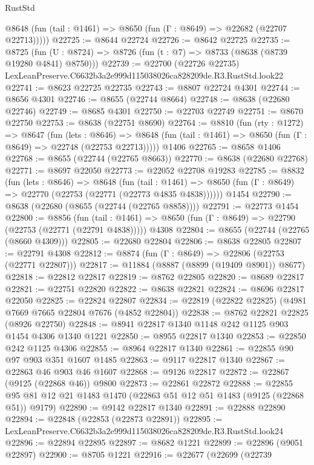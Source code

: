 \begin{lexlean}{RustStd}
\begin{coremodule}
      @8648 (fun (tail : @1461) => @8650 (fun (Γ : @8649) => @22682 (@22707 @22713)))))
@22725 := @8644 @22724
@22726 := @8642 @22725
@22735 := @8725
    (fun (U : @8724) => @8726 (fun (t : @7) => @8733 (@8638 (@8739 @19280 @4841) @8750)))
@22739 := @22700 (@22726 @22735) LexLeanPreserve.C6632b3a2e999d115038026ca828209de.R3.RustStd.look22
@22741 := @8623 @22725 @22735
@22743 := @8807 @22724 @4301
@22744 := @8656 @4301
@22746 := @8655 (@22744 @8664)
@22748 := @8638 (@22680 @22746)
@22749 := @8685 @4301
@22750 := @22703 @22749
@22751 := @8670 @22750
@22753 := @8638 (@22751 @8690)
@22764 := @8810
    (fun (rty : @1272) =>
    @8647
      (fun (lets : @8646) =>
      @8648 (fun (tail : @1461) => @8650 (fun (Γ : @8649) => @22748 (@22753 @22713)))))
    @1406
@22765 := @8658 @1406
@22768 := @8655 (@22744 (@22765 @8663))
@22770 := @8638 (@22680 @22768)
@22771 := @8697 @22050
@22773 := @22052 @22708 @19283
@22785 := @8832
    (fun (lets : @8646) =>
    @8648
      (fun (tail : @1461) =>
      @8650 (fun (Γ : @8649) => @22770 (@22753 (@22771 (@22773 @4835 @4838))))))
    @1454
@22790 := @8638 (@22680 (@8655 (@22744 (@22765 @8858))))
@22791 := @22773 @1454
@22800 := @8856
    (fun (tail : @1461) => @8650 (fun (Γ : @8649) => @22790 (@22753 (@22771 (@22791 @4838)))))
    @4308
@22804 := @8655 (@22744 (@22765 (@8660 @4309)))
@22805 := @22680 @22804
@22806 := @8638 @22805
@22807 := @22791 @4308
@22812 := @8874 (fun (Γ : @8649) => @22806 (@22753 (@22771 @22807)))
@22817 := @11884 (@8887 (@8899 (@19409 @8901)) @8677)
@22818 := @22812 @22817
@22819 := @8762 @22805
@22820 := @8689 @22817
@22821 := @22751 @22820
@22822 := @8638 @22821
@22824 := @8696 @22817 @22050
@22825 := @22824 @22807
@22834 := @22819 (@22822 @22825) (@4981 @7669 @7665 @22804 @7676 (@4852 @22804))
@22838 := @8762 @22821 @22825 (@8926 @22750)
@22848 := @8941 @22817 @1340 @1148 @242 @1125 @903 @1454 @4306 @1340 @1221
@22850 := @8955 @22817 @1340
@22853 := @22850 @242 @1125 @4306
@22855 := @8964 @22817 @1340
@22861 := @22855 @90 @97 @903 @351 @1607 @1485
@22863 := @9117 @22817 @1340
@22867 := @22863 @46 @903 @46 @1607
@22868 := @9126 @22817
@22872 := @22867 (@9125 (@22868 @46)) @9800
@22873 := @22861 @22872
@22888 := @22855 @95 @81 @12 @21 @1483 @1470 (@22863 @51 @12 @51 @1483 (@9125 (@22868 @51)) @9179)
@22890 := @9142 @22817 @1340
@22891 := @22888 @22890
@22894 := @22848 (@22853 (@22873 @22891))
@22895 := LexLeanPreserve.C6632b3a2e999d115038026ca828209de.R3.RustStd.look24
@22896 := @22894 @22895
@22897 := @8682 @1221
@22899 := @22896 (@9051 @22897)
@22900 := @8705 @1221
@22916 := @22677
    (@22699
      (@22739

\end{coremodule}
\end{lexlean}
